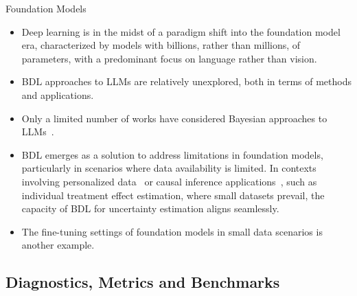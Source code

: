 \documentclass[9pt]{beamer}
\begin{document}
\begin{frame}{Foundation Models}
\begin{itemize}[<+->]
	\item Deep learning is in the midst of a paradigm shift into the \alert{foundation model} era, characterized by models with \alert{billions, }rather than millions, of parameters, with a predominant focus on \alert{language} rather than vision. 
	\item BDL approaches to LLMs are relatively unexplored, both in terms of methods and applications. 
	\item Only a limited number of works have considered Bayesian approaches to LLMs~\citep{xie2021,cohen2022bayesian, margatina2022,yang2023bayesian}. %
	\item BDL emerges as a solution to address limitations in foundation models, particularly in scenarios where data availability is limited. In contexts involving \alert{personalized data}~\citep{moor2023foundation} or \alert{causal inference applications}~\citep{zhang2023towards}, such as individual treatment effect estimation, where small datasets prevail, the capacity of BDL for uncertainty estimation aligns seamlessly. 
	\item The \alert{fine-tuning settings} of foundation models in small data scenarios is another example. %
%
\end{itemize}
\end{frame}


\subsection{Diagnostics, Metrics and Benchmarks}
\end{document}
